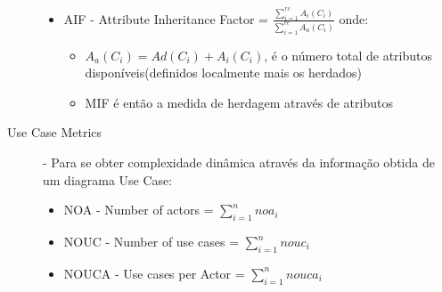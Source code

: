\begin{description}
\begin{itemize}
				   \item AIF - Attribute Inheritance Factor = $ \frac{\sum_{i=1}^{rc} A_i(C_i)}{\sum_{i=1}^{rc} A_a(C_i)} $ onde: \begin{itemize}
				                                                                                                                \item $ A_a(C_i) = Ad(C_i) + A_i(C_i)$, é o número total de atributos disponíveis(definidos localmente mais os herdados)
				                                                                                                                \item MIF é então a medida de herdagem através de atributos
				                                                                                                               \end{itemize}

                                  \end{itemize}
 \item [Use Case Metrics] - Para se obter complexidade dinâmica através da informação obtida de um diagrama Use Case:\begin{itemize}
                             \item NOA - Number of actors = $ \sum_{i=1}^{n} noa_i $
                             \item NOUC - Number of use cases = $ \sum_{i=1}^{n} nouc_i $
                             \item NOUCA - Use cases per Actor = $ \sum_{i=1}^{n} nouca_i $
                            \end{itemize}
  
\end{description}
